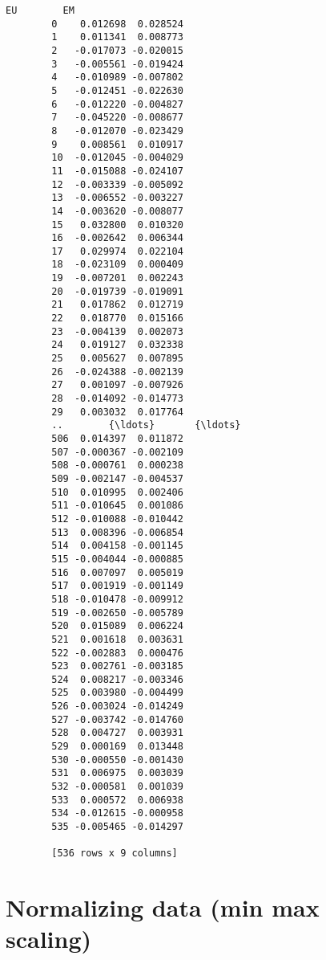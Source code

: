\documentclass[11pt]{article}
\begin{document}
\begin{Verbatim}[commandchars=\\\{\}]
                   EU        EM  
        0    0.012698  0.028524  
        1    0.011341  0.008773  
        2   -0.017073 -0.020015  
        3   -0.005561 -0.019424  
        4   -0.010989 -0.007802  
        5   -0.012451 -0.022630  
        6   -0.012220 -0.004827  
        7   -0.045220 -0.008677  
        8   -0.012070 -0.023429  
        9    0.008561  0.010917  
        10  -0.012045 -0.004029  
        11  -0.015088 -0.024107  
        12  -0.003339 -0.005092  
        13  -0.006552 -0.003227  
        14  -0.003620 -0.008077  
        15   0.032800  0.010320  
        16  -0.002642  0.006344  
        17   0.029974  0.022104  
        18  -0.023109  0.000409  
        19  -0.007201  0.002243  
        20  -0.019739 -0.019091  
        21   0.017862  0.012719  
        22   0.018770  0.015166  
        23  -0.004139  0.002073  
        24   0.019127  0.032338  
        25   0.005627  0.007895  
        26  -0.024388 -0.002139  
        27   0.001097 -0.007926  
        28  -0.014092 -0.014773  
        29   0.003032  0.017764  
        ..        {\ldots}       {\ldots}  
        506  0.014397  0.011872  
        507 -0.000367 -0.002109  
        508 -0.000761  0.000238  
        509 -0.002147 -0.004537  
        510  0.010995  0.002406  
        511 -0.010645  0.001086  
        512 -0.010088 -0.010442  
        513  0.008396 -0.006854  
        514  0.004158 -0.001145  
        515 -0.004044 -0.000885  
        516  0.007097  0.005019  
        517  0.001919 -0.001149  
        518 -0.010478 -0.009912  
        519 -0.002650 -0.005789  
        520  0.015089  0.006224  
        521  0.001618  0.003631  
        522 -0.002883  0.000476  
        523  0.002761 -0.003185  
        524  0.008217 -0.003346  
        525  0.003980 -0.004499  
        526 -0.003024 -0.014249  
        527 -0.003742 -0.014760  
        528  0.004727  0.003931  
        529  0.000169  0.013448  
        530 -0.000550 -0.001430  
        531  0.006975  0.003039  
        532 -0.000581  0.001039  
        533  0.000572  0.006938  
        534 -0.012615 -0.000958  
        535 -0.005465 -0.014297  
        
        [536 rows x 9 columns]
\end{Verbatim}
            
    \hypertarget{normalizing-data-min-max-scaling}{%
\section{Normalizing data (min max
scaling)}\label{normalizing-data-min-max-scaling}}
\end{document}
